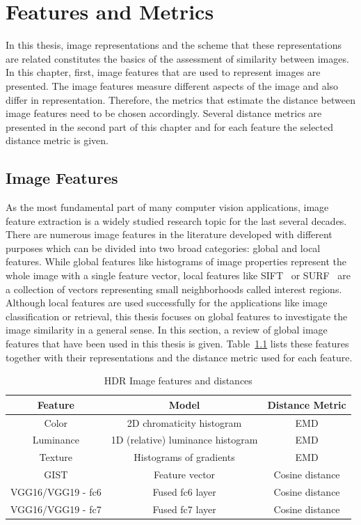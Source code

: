 \chapter{Features and Metrics}
\label{chp:b3}

In this thesis, image representations and the scheme that these representations are related constitutes the basics of the assessment of similarity between images. In this chapter, first, image features that are used to represent images are presented. The image features measure different aspects of the image and also differ in representation. Therefore, the metrics that estimate the distance between image features need to be chosen accordingly. Several distance metrics are presented in the second part of this chapter and for each feature the selected distance metric is given. 

\section{Image Features}
\label{sec:features}
As the most fundamental part of many computer vision applications, image feature extraction is a widely studied research topic for the last several decades. There are numerous image features in the literature developed with different purposes which can be divided into two broad categories: global and local features. While global features like histograms of image properties represent the whole image with a single feature vector, local features like SIFT~\cite{lowe2004distinctive} or SURF~\cite{bay2006surf} are a collection of vectors representing small neighborhoods called interest regions. Although local features are used successfully for the applications like image classification or retrieval, this thesis focuses on global features to investigate the image similarity in a general sense. In this section, a review of global image features that have been used in this thesis is given. Table~\ref{tab:table_feature} lists these features together with their representations and the distance metric used for each feature. 

\begin{table}
\caption{HDR Image features and distances}
\centering
\begin{tabular}{c|c|c}
\label{tab:table_feature}
\textbf{Feature} & \textbf{Model} & \textbf{Distance Metric}\\
\hline
Color  & 2D chromaticity histogram & EMD \\
Luminance  & 1D (relative) luminance histogram & EMD \\
Texture  & Histograms of gradients & EMD \\
GIST  & Feature vector & Cosine distance \\
VGG16/VGG19 - fc6 & Fused fc6 layer & Cosine distance  \\
VGG16/VGG19 - fc7 & Fused fc7 layer & Cosine distance
\end{tabular}
\end{table}

